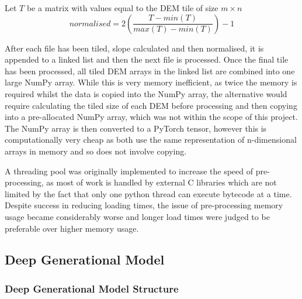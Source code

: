 \documentclass[twocolumn]{article}
\begin{document}
Let \(T\) be a matrix with values equal to the DEM tile of size \(m \times n\)
\begin{equation}\label{eq:normalise}
normalised = 2\left(\frac{T - min(T)}{max(T) - min(T)}\right) - 1
\end{equation}

After each file has been tiled, slope calculated and then normalised, it is appended to a linked list and then the next file is processed.
Once the final tile has been processed, all tiled DEM arrays in the linked list are combined into one large NumPy array.
While this is very memory inefficient, as twice the memory is required whilst the data is copied into the NumPy array, the alternative would require calculating the tiled size of each DEM before processing and then copying into a pre-allocated NumPy array, which was not within the scope of this project.
The NumPy array is then converted to a PyTorch tensor, however this is computationally very cheap as both use the same representation of n-dimensional arrays in memory and so does not involve copying.

A threading pool was originally implemented to increase the speed of pre-processing, as most of work is handled by external C libraries which are not limited by the fact that only one python thread can execute bytecode at a time.
Despite success in reducing loading times, the issue of pre-processing memory usage became considerably worse and longer load times were judged to be preferable over higher memory usage.


\subsection{Deep Generational Model}
\label{sec:org5799099}
\subsubsection{Deep Generational Model Structure}
\label{sec:org94fe87f}
\end{document}
